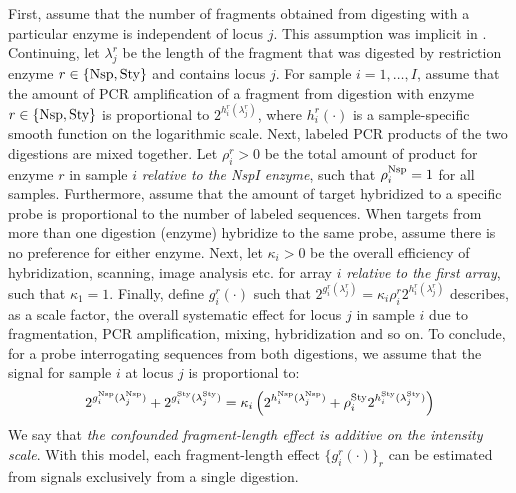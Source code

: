 \documentclass{bioinfo}
\newcommand{\NspI}{\emph{Nsp}I\xspace}
\newcommand{\Nsp}{\ensuremath{\textnormal{Nsp}}\xspace}
\newcommand{\Sty}{\ensuremath{\textnormal{Sty}}\xspace}
\begin{document}
First, assume that the number of fragments obtained from digesting with a particular enzyme is independent of locus $j$.  This assumption was implicit in \citet{BengtssonH_etal_2008}.
Continuing, let $\lambda^{r}_j$ be the length of the fragment that was digested by restriction enzyme $r \in \{\Nsp, \Sty\}$ and contains locus $j$.
For sample $i=1,\ldots,I$, assume that the amount of PCR amplification of a fragment from digestion with enzyme $r \in \{\Nsp, \Sty\}$ is proportional to $2^{h^{r}_{i}(\lambda^{r}_{j})}$, where $h^{r}_{i}(\cdot)$ is a sample-specific smooth function on the logarithmic scale.
Next, labeled PCR products of the two digestions are mixed together.  Let $\rho^{r}_{i} > 0$ be the total amount of product for enzyme $r$ in sample $i$ \emph{relative to the \NspI enzyme}, such that $\rho^{\Nsp}_{i}=1$ for all samples.
Furthermore, assume that the amount of target hybridized to a specific probe is proportional to the number of labeled sequences.  When targets from more than one digestion (enzyme) hybridize to the same probe, assume there is no preference for either enzyme. 
Next, let $\kappa_{i} > 0$ be the overall efficiency of hybridization, scanning, image analysis etc. for array $i$ \emph{relative to the first array}, such that $\kappa_{1} = 1$.
Finally, define $g^{r}_{i}(\cdot)$ such that $2^{g^{r}_{i}(\lambda^{r}_{j})} = \kappa_{i} \rho^{r}_{i} 2^{h^{r}_{i}(\lambda^{r}_{j})}$ describes, as a scale factor, the overall systematic effect for locus $j$ in sample $i$  due to fragmentation, PCR amplification, mixing, hybridization and so on.
To conclude, for a probe interrogating sequences from both digestions, we assume that the signal for sample $i$ at locus $j$ is proportional to:
 \begin{equation}
  2^{g^{\Nsp}_{i}(\lambda^{\Nsp}_{j})} + 2^{g^{\Sty}_{i}(\lambda^{\Sty}_{j})}
  = \kappa_{i} \left(
      2^{h^{\Nsp}_{i}(\lambda^{\Nsp}_{j})}
      + \rho^{\Sty}_{i} 2^{h^{\Sty}_{i}(\lambda^{\Sty}_{j})}
    \right)
 \end{equation}
We say that \emph{the confounded fragment-length effect is additive on the intensity scale}. %
With this model, each fragment-length effect $\{g_i^r(\cdot)\}_r$ can be estimated from signals exclusively from a single digestion.
\end{document}
